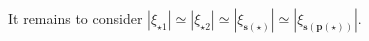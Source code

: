 \documentclass[%
11pt,  reqno]{amsart}
\newcommand{\5}{\textup{V}}
\newcommand{\ind}{\mathbbm 1}
\newcommand{\les}{\lesssim}
\newcommand{\wt}{\widetilde}
\theoremstyle{remark}
\newcommand{\R}{\mathbb{R}}
\newcommand{\bul}{\bullet}
\newcommand{\TT}{\mathcal{T}}
\newcommand{\al}{\alpha}
\newcommand{\pb}{\mathbf{p}}
\newcommand{\sbf}{\mathbf{s}}
\newcommand{\jb}[1]
{\langle #1 \rangle}
\numberwithin{equation}{section}
\numberwithin{theorem}{section}
\begin{document}
It remains to consider $|\xi_{\star1}| \simeq |\xi_{\star2}| \simeq |\xi_{\sbf(\star)}| \simeq |\xi_{\sbf(\pb(\star))}| $.
% 
\end{document}
